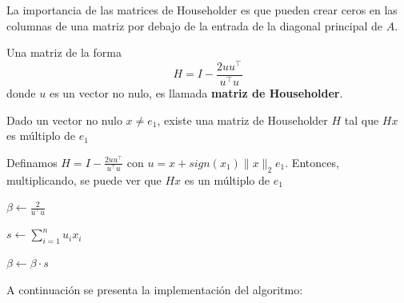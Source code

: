 La importancia de las matrices de Householder es que pueden crear ceros en las columnas de una matriz por debajo de la entrada de la diagonal principal de $A$.
\begin{deff}{}{}
Una matriz de la forma
\[
H = I - \frac{2uu^\top}{u^\top u}
\]
donde $u$ es un vector no nulo, es llamada \textbf{matriz de Householder}.
\end{deff}
\begin{lema}{}{}
Dado un vector no nulo $x \neq e_1$, existe una matriz de Householder $H$ tal que $Hx$ es múltiplo de $e_1$
\end{lema}
\begin{prueba}
Definamos $H = I - \frac{2uu^\top}{u^\top u}$ con $u = x + sign(x_1) \|x\|_2 e_1$. Entonces, multiplicando, se puede ver que $Hx$ es un múltiplo de $e_1$
\end{prueba}
\begin{algorithm}[H]
\DontPrintSemicolon
{}


\BlankLine
{}
$\beta \leftarrow \frac{2}{u^\top u}$ \;

$s \leftarrow \sum_{i=1}^{n} u_i x_i$ \;

$\beta \leftarrow \beta \cdot s$ \;


\caption{Producto de un vector con una matriz de Householder ($Hx$)}
\end{algorithm}

A continuación se presenta la implementación del algoritmo:



